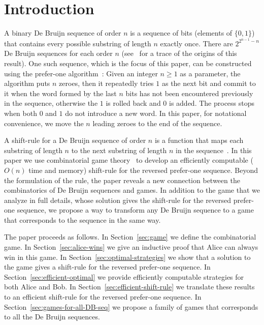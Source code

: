 \documentclass[final,12pt]{elsarticle}
\theoremstyle{definition} \newtheorem{definition}[theorem]{Definition} \newtheorem{observation}[theorem]{Observation} \newtheorem{example}[theorem]{Example} \newtheorem{remark}[theorem]{Remark} \newtheorem{corrolary}[theorem]{Corrolary}
\newcommand{\REF}[2]{#1~\ref{#2}}
\begin{document}
\section{Introduction}
\label{sec:introduction}

A binary De Bruijn sequence of order $n$ is a sequence of bits (elements of $\{0,1\}$) that contains every possible substring of length $n$ exactly once. There are $2^{2^{n-1}-n}$ De Bruijn sequences for each order $n$ (see~\cite{de1975acknowledgement} for a trace of the origins of this result). One such sequence, which is the focus of this paper, can be constructed using the prefer-one algorithm~\cite{Mar34}: Given an integer $n \geq 1$ as a parameter, the algorithm puts $n$ zeroes, then it repeatedly tries $1$ as the next bit and commit to it when the word formed by the last $n$ bits has not been encountered previously in the sequence, otherwise the $1$ is rolled back and $0$ is added. The process stops when both $0$ and $1$ do not introduce a new word. In this paper, for notational convenience, we move the $n$ leading zeroes to the end of the sequence.

A shift-rule for a De Bruijn sequence of order $n$ is a function that maps each substring of length $n$ to the next substring of length $n$ in the sequence~\cite{SAWADA2017524}. In this paper we use combinatorial game theory~\cite{berlekamp2003winning} to develop an efficiently computable ($O(n)$ time and memory) shift-rule for the reversed prefer-one sequence. Beyond the formulation of the rule, the paper reveals a new connection between the combinatorics of De Bruijn sequences and games. In addition to the game that we analyze in full details, whose solution gives the shift-rule for the reversed prefer-one sequence, we propose a way to transform any De Bruijn sequence to a game that corresponds to the sequence in the same way.

The paper proceeds as follows. In \REF{Section}{sec:game} we define the combinatorial game. In Section~\ref{sec:alice-wins} we give an inductive proof that Alice can always win in this game. In Section~\ref{sec:optimal-strategies} we show that a solution to the game gives a shift-rule for the reversed prefer-one sequence. In Section~\ref{sec:efficient-optimal} we provide efficiently computable strategies for both Alice and Bob. In Section~\ref{sec:efficient-shift-rule} we translate these results to an efficient shift-rule for the reversed prefer-one sequence. In Section~\ref{sec:games-for-all-DB-seq} we propose a family of games that corresponds to all the De Bruijn sequences.
\end{document}
